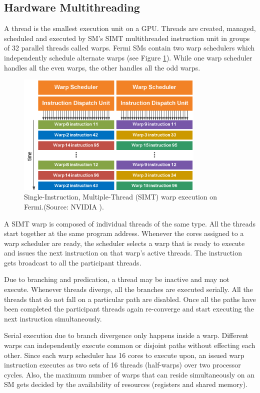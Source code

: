 \subsection{Hardware Multithreading}
A thread is the smallest execution unit on a GPU. Threads are created, managed, scheduled and executed by SM's SIMT multithreaded instruction unit in groups of 32 parallel threads called warps. Fermi SMs contain two warp schedulers which independently schedule alternate warps (see Figure \ref{fig:fermi:warp}). While one warp scheduler handles all the even warps, the other handles all the odd warps.
\begin{figure}[h]
	\centerline{
   \includegraphics[width=0.8\textwidth]{./Data/nvidia/warp_fermi}  	
	}
	\caption{ Single-Instruction, Multiple-Thread (SIMT) warp execution on Fermi.(Source: NVIDIA \cite{fermiWhitepaper}).}
\label{fig:fermi:warp}
\end{figure}


A SIMT warp is composed of individual threads of the same type. All the threads start together at the same program address. Whenever the cores assigned to a warp scheduler are ready, the scheduler selects a warp that is ready to execute and issues the next instruction on that warp's active threads. The instruction gets broadcast to all the participant threads.

Due to branching and predication, a thread may be inactive and may not execute. Whenever threads diverge, all the branches are executed serially. All the threads that do not fall on a particular path are disabled. Once all the paths have been completed the participant threads again re-converge and start executing the next instruction simultaneously.

Serial execution due to branch divergence only happens inside a warp. Different warps can independently execute common or disjoint paths without effecting each other. Since each warp scheduler has 16 cores to execute upon, an issued warp instruction executes as two sets of 16 threads (half-warps) over two processor cycles. Also, the maximum number of warps that can reside simultaneously on an SM gets decided by the availability of resources (registers and shared memory).

